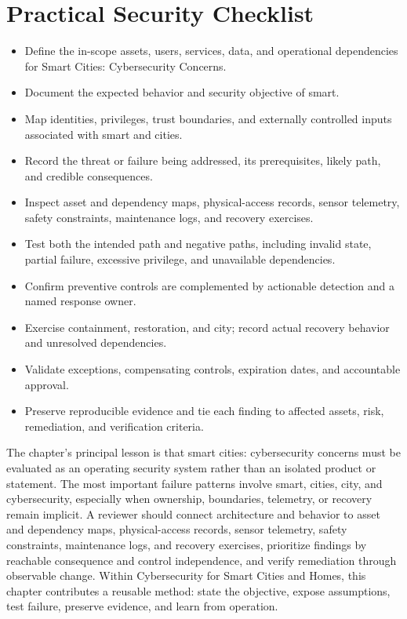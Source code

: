 \documentclass[11pt]{article}
\begin{document}
\section*{Practical Security Checklist}
\begin{itemize}[label=$\square$]
\item Define the in-scope assets, users, services, data, and operational dependencies for Smart Cities: Cybersecurity Concerns.
\item Document the expected behavior and security objective of smart.
\item Map identities, privileges, trust boundaries, and externally controlled inputs associated with smart and cities.
\item Record the threat or failure being addressed, its prerequisites, likely path, and credible consequences.
\item Inspect asset and dependency maps, physical-access records, sensor telemetry, safety constraints, maintenance logs, and recovery exercises.
\item Test both the intended path and negative paths, including invalid state, partial failure, excessive privilege, and unavailable dependencies.
\item Confirm preventive controls are complemented by actionable detection and a named response owner.
\item Exercise containment, restoration, and city; record actual recovery behavior and unresolved dependencies.
\item Validate exceptions, compensating controls, expiration dates, and accountable approval.
\item Preserve reproducible evidence and tie each finding to affected assets, risk, remediation, and verification criteria.
\end{itemize}
\begin{synthesisbox}
The chapter's principal lesson is that smart cities: cybersecurity concerns must be evaluated as an operating security system rather than an isolated product or statement. The most important failure patterns involve smart, cities, city, and cybersecurity, especially when ownership, boundaries, telemetry, or recovery remain implicit. A reviewer should connect architecture and behavior to asset and dependency maps, physical-access records, sensor telemetry, safety constraints, maintenance logs, and recovery exercises, prioritize findings by reachable consequence and control independence, and verify remediation through observable change. Within Cybersecurity for Smart Cities and Homes, this chapter contributes a reusable method: state the objective, expose assumptions, test failure, preserve evidence, and learn from operation.
\end{synthesisbox}
\end{document}
